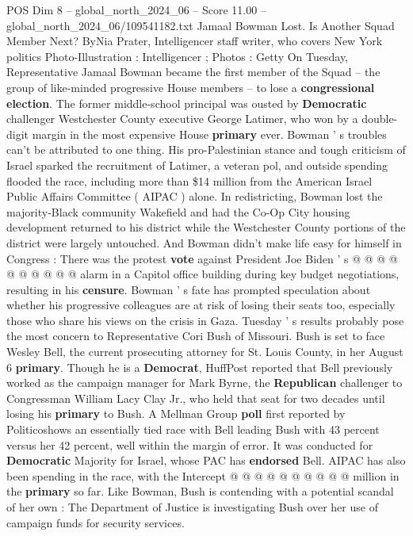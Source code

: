 \begin{textsample}{POS Dim 8 – global\_north\_2024\_06 – Score 11.00 – global\_north\_2024\_06/109541182.txt}  \label{ex:f8_pos_065}
Jamaal Bowman Lost.
Is Another Squad Member Next?
ByNia Prater, Intelligencer staff writer, who covers New York politics Photo-Illustration : Intelligencer ; Photos : Getty On Tuesday, Representative Jamaal Bowman became the first member of the Squad -- the group of like-minded progressive House members -- to lose a \textbf{congressional} \textbf{election}.
The former middle-school principal was ousted by \textbf{Democratic} challenger Westchester County executive George Latimer, who won by a double-digit margin in the most expensive House \textbf{primary} ever.
Bowman ' s troubles can't be attributed to one thing.
His pro-Palestinian stance and tough criticism of Israel sparked the recruitment of Latimer, a veteran pol, and outside spending flooded the race, including more than \$14 million from the American Israel Public Affairs Committee ( AIPAC ) alone.
In redistricting, Bowman lost the majority-Black community Wakefield and had the Co-Op City housing development returned to his district while the Westchester County portions of the district were largely untouched.
And Bowman didn't make life easy for himself in Congress : There was the protest \textbf{vote} against President Joe Biden ' s @ @ @ @ @ @ @ @ @ @ alarm in a Capitol office building during key budget negotiations, resulting in his \textbf{censure}.
Bowman ' s fate has prompted speculation about whether his progressive colleagues are at risk of losing their seats too, especially those who share his views on the crisis in Gaza.
Tuesday ' s results probably pose the most concern to Representative Cori Bush of Missouri.
Bush is set to face Wesley Bell, the current prosecuting attorney for St.
Louis County, in her August 6 \textbf{primary}.
Though he is a \textbf{Democrat}, HuffPost reported that Bell previously worked as the campaign manager for Mark Byrne, the \textbf{Republican} challenger to Congressman William Lacy Clay Jr., who held that seat for two decades until losing his \textbf{primary} to Bush.
A Mellman Group \textbf{poll} first reported by Politicoshows an essentially tied race with Bell leading Bush with 43 percent versus her 42 percent, well within the margin of error.
It was conducted for \textbf{Democratic} Majority for Israel, whose PAC has \textbf{endorsed} Bell.
AIPAC has also been spending in the race, with the Intercept @ @ @ @ @ @ @ @ @ @ million in the \textbf{primary} so far.
Like Bowman, Bush is contending with a potential scandal of her own : The Department of Justice is investigating Bush over her use of campaign funds for security services.

\end{textsample}
